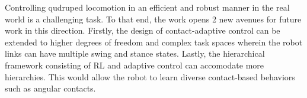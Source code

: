 \documentclass[11pt,letterpaper]{article}
\begin{document}
Controlling qudruped locomotion in an efficient and robust manner in the real world is a challenging task. To that end, the work opens 2 new avenues for future work in this direction. Firstly, the design of contact-adaptive control can be extended to higher degrees of freedom and complex task spaces wherein the robot links can have multiple swing and stance states. Lastly, the hierarchical framework consisting of RL and adaptive control can accomodate more hierarchies. This would allow the robot to learn diverse contact-based behaviors such as angular contacts. 
\end{document}

